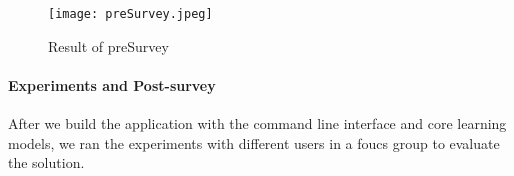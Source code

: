 \begin{figure}[ht]
\caption{Result of preSurvey}
\label{result_of_presurvey}
\centering
\texttt{[image: preSurvey.jpeg]}
\end{figure}

\paragraph{Experiments and Post-survey}
After we build the application with the command line interface and core learning models, we ran the experiments with different users in a foucs group to evaluate the solution.

